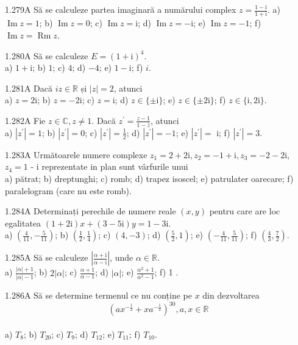 \documentclass[11pt]{article}
\begin{document}
1.279A Să se calculeze partea imaginară a numărului complex $z=\frac{1-\mathrm{i}}{1+\mathrm{i}}$. a) $\operatorname{Im} z=1$; b) $\operatorname{Im} z=0$; c) $\operatorname{Im} z=\mathrm{i}$; d) $\operatorname{Im} z=-\mathrm{i}$; e) $\operatorname{Im} z=-1$; f) $\operatorname{Im} z= \operatorname{Rm} z$.

1.280A Să se calculeze $E=(1+\mathrm{i})^{4}$.\\ a) $1+\mathrm{i}$; b) $1$; c) $4$; d) $-4$; e) $1-\mathrm{i}$; f) $i$.

1.281A Dacă $i z \in \mathbb{R}$ și $|z|=2$, atunci\\ a) $z=2 \mathrm{i}$; b) $z=-2 \mathrm{i}$; c) $z=\mathrm{i}$; d) $z \in\{ \pm \mathrm{i}\}$; e) $z \in\{ \pm 2 \mathrm{i}\}$; f) $z \in\{\mathrm{i}, 2 \mathrm{i}\}$.

1.282A Fie $z \in \mathbb{C}, z \neq 1$. Dacă $z^{\prime}=\frac{z-1}{1-\bar{z}}$, atunci\\ a) $\left|z^{\prime}\right|=1$; b) $\left|z^{\prime}\right|=0$; c) $\left|z^{\prime}\right|=\frac{1}{2}$; d) $\left|z^{\prime}\right|=-1$; e) $\left|z^{\prime}\right|=$ i; f) $\left|z^{\prime}\right|=3$.

1.283A Următoarele numere complexe $z_{1}=2+2 \mathrm{i}, z_{2}=-1+\mathrm{i}, z_{3}=-2-2 \mathrm{i}$, $z_{4}=1$ - $\mathrm{i}$ reprezentate in plan sunt vârfurile unui\\ a) pătrat; b) dreptunghi; c) romb; d) trapez isoscel; e) patrulater oarecare; f) paralelogram (care nu este romb).

1.284A Determinați perechile de numere reale $(x, y)$ pentru care are loc egalitatea $(1+2 \mathrm{i}) x+(3-5 \mathrm{i}) y=1-3 \mathrm{i}$.\\ a) $\left(\frac{4}{11},-\frac{5}{11}\right)$; b) $\left(\frac{1}{2}, \frac{1}{4}\right)$; c) $(4,-3)$; d) $\left(\frac{5}{2}, 1\right)$; e) $\left(-\frac{4}{11}, \frac{5}{11}\right)$; f) $\left(\frac{4}{3}, \frac{7}{2}\right)$.

1.285A Să se calculeze $\left|\frac{\alpha+\mathrm{i}}{\alpha-\mathrm{i}}\right|$, unde $\alpha \in \mathbb{R}$.\\ a) $\frac{|\alpha|+1}{|\alpha|-1}$; b) $2|\alpha|$; c) $\frac{\alpha+1}{\alpha-1}$; d) $|\alpha|$; e) $\frac{\alpha^{2}+1}{\alpha^{2}-1}$; f) 1 .

1.286A Să se determine termenul ce nu conține pe $x$ din dezvoltarea $$\left(a x^{-\frac{1}{2}}+x a^{-\frac{1}{2}}\right)^{30}, a, x \in \mathbb{R}$$\\ a) $T_{8}$; b) $T_{20}$; c) $T_{9}$; d) $T_{12}$; e) $T_{11}$; f) $T_{10}$.
\end{document}
